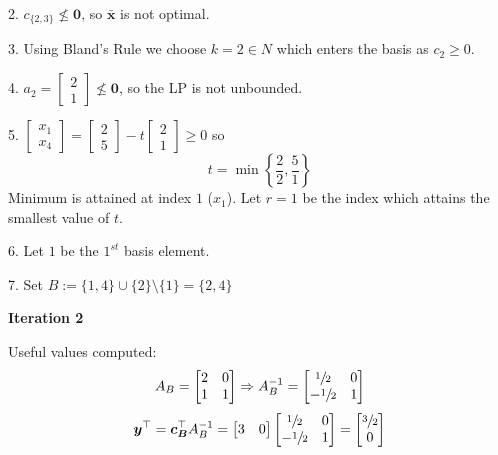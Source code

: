 \begin{exbox}
\begin{example}
        2. $ c_{\{2,3\}} \nleq \bm{0} $, so $ \bm{\bar{x}} $ is not optimal.

        3. Using Bland's Rule we choose $ k=2\in N $ which enters the basis
        as $ c_2\geqslant  0 $.

        4.
        $
            a_2= \begin{bmatrix}
                2 \\
                1
            \end{bmatrix}\nleq \bm{0}
        $, so the LP is not unbounded.

        5.
        $
            \begin{bmatrix}
                x_1 \\
                x_4
            \end{bmatrix}
            =
            \begin{bmatrix}
                2 \\
                5
            \end{bmatrix}-t
            \begin{bmatrix}
                2 \\
                1
            \end{bmatrix}\geqslant  0
        $
        so
        \[ t=\min \left\{\frac{2}{2},\frac{5}{1} \right\} \]
        Minimum is attained at index $ 1 $ ($ x_1 $). Let $ r=1 $ be the index which attains the smallest value of $ t $.

        6. Let $ 1 $ be the $ 1^{st} $ basis element.

        7. Set $ B:=\{1,4\}\cup \{2\}\setminus\{1\}=\{2,4\} $

        \textbf{Iteration 2}

        Useful values computed:
        \[ A_B=
            \begin{bmatrix}
                2 & 0 \\
                1 & 1 \\
            \end{bmatrix} \Rightarrow
            A_B^{-1}=
            \begin{bmatrix}
                \sfrac{1}{2}  & 0 \\
                -\sfrac{1}{2} & 1 \\
            \end{bmatrix} \]
        \[ \bm{y}^\top=\bm{c_B}^\top A_B^{-1}=
            \begin{bmatrix}
                3 & 0
            \end{bmatrix}
            \begin{bmatrix}
                \sfrac{1}{2}  & 0 \\
                -\sfrac{1}{2} & 1 \\
            \end{bmatrix}=
            \begin{bmatrix}
                \sfrac{3}{2} \\
                0
            \end{bmatrix}\]


\end{example}
\end{exbox}
